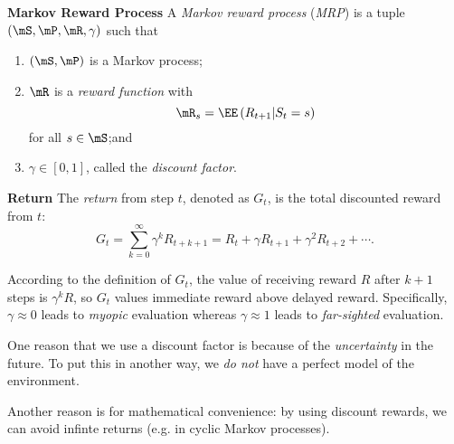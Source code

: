 \documentclass[RL]{subfiles}
\begin{document}
    \begin{definition}{\textbf{Markov Reward Process}}
        A \emph{Markov reward process} (\emph{MRP}) is a tuple $\left( \mS,\mP,\mR,\gamma \right)$ such that 
        \begin{enumerate}
            \item $\left( \mS,\mP \right)$ is a Markov process;
            \item $\mR$ is a \emph{reward function} with
                \begin{equation*}
                    \mR_s = \EE\left( R_{t+1}|S_t=s \right)
                \end{equation*}
                for all $s\in\mS$;\footnotemark[1] and
            \item $\gamma\in\left[ 0,1 \right]$, called the \emph{discount factor}.
        \end{enumerate}
        
        \noindent
        \begin{minipage}{\textwidth}
        \end{minipage}
    \end{definition}

    \begin{definition}{\textbf{Return}}
        The \emph{return} from step $t$, denoted as $G_t$, is the total discounted reward from $t$:
        \begin{equation*}
            G_t = \sum^{\infty}_{k=0}\gamma^k R_{t+k+1} = R_t + \gamma R_{t+1} + \gamma^{2}R_{t+2} + \cdots.
        \end{equation*}
    \end{definition}

    \np According to the definition of $G_t$, the value of receiving reward $R$ after $k+1$ steps is $\gamma^kR$, so $G_t$ values immediate reward above delayed reward. Specifically, $\gamma\approx 0$ leads to \emph{myopic} evaluation whereas $\gamma\approx 1$ leads to \emph{far-sighted} evaluation.

    \np One reason that we use a discount factor is because of the \textit{uncertainty} in the future. To put this in another way, we \textit{do not} have a perfect model of the environment. 

    Another reason is for mathematical convenience: by using discount rewards, we can avoid infinte returns (e.g. in cyclic Markov processes).
\end{document}
